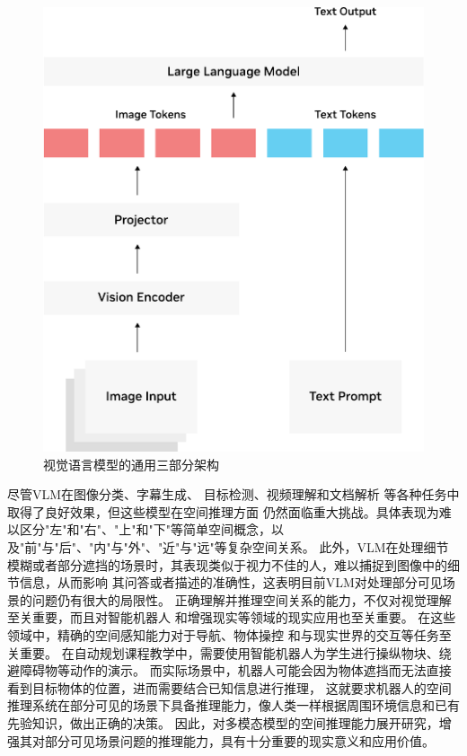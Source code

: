 \begin{figure}[htb]
    \centering
    \includegraphics[scale=0.6]{figures/vlm-architecture-diagram-crop.pdf}
    \caption{视觉语言模型的通用三部分架构}
    \label{fig:vlm-architecture}
\end{figure}

尽管VLM在图像分类\cite{pratt2023does}、字幕生成\cite{alaluf2024myvlm}、
目标检测\cite{kuo2022f}、视频理解\cite{huang2024lita}和文档解析\cite{lv2023kosmos}
等各种任务中取得了良好效果，但这些模型在空间推理方面
仍然面临重大挑战。具体表现为难以区分"左"和"右"、"上"和"下"等简单空间概念，以及"前"与"后"、"内"与"外"、"近"与"远"等复杂空间关系\cite{fu2024blink}\cite{majumdar2024openeqa}\cite{zhang2024countercurate}。
此外，VLM在处理细节模糊或者部分遮挡的场景时，其表现类似于视力不佳的人，难以捕捉到图像中的细节信息，从而影响
其问答或者描述的准确性，这表明目前VLM对处理部分可见场景的问题仍有很大的局限性\cite{rahmanzadehgervi2025visionlanguagemodelsblind}。
正确理解并推理空间关系的能力，不仅对视觉理解至关重要，而且对智能机器人\cite{gao2024physically}\cite{nasiriany2024pivot}
和增强现实\cite{konenkov2024vr}等领域的现实应用也至关重要。
在这些领域中，精确的空间感知能力对于导航\cite{huang2023visual}、物体操控\cite{gao2024physically}
和与现实世界的交互\cite{driess2023palm}等任务至关重要。
在自动规划课程教学中，需要使用智能机器人为学生进行操纵物块、绕避障碍物等动作的演示。
而实际场景中，机器人可能会因为物体遮挡而无法直接看到目标物体的位置，进而需要结合已知信息进行推理，
这就要求机器人的空间推理系统在部分可见的场景下具备推理能力，像人类一样根据周围环境信息和已有先验知识，做出正确的决策。
因此，对多模态模型的空间推理能力展开研究，增强其对部分可见场景问题的推理能力，具有十分重要的现实意义和应用价值。


